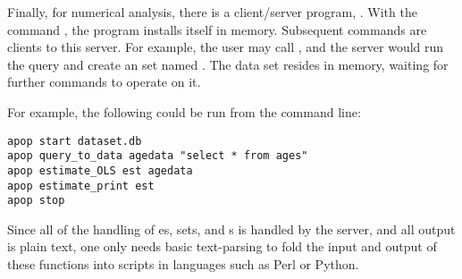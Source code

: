 Finally, for numerical analysis, there is a client/server program,
.  With the command , the program installs itself in memory.
Subsequent commands are clients to this server. For
example, the user may call , and the server would run the query and create an
 set named . The data set resides in
memory, waiting for further commands to operate on it.

For example, the following could be run from the command line:
\begin{lstlisting}
apop start dataset.db
apop query_to_data agedata "select * from ages"
apop estimate_OLS est agedata 
apop estimate_print est
apop stop
\end{lstlisting}

Since all of the handling of es,
 sets, and s is handled by
the server, and all output is plain text, one only needs
basic text-parsing to fold the input and output of these functions into
scripts in languages such as Perl or Python.  

